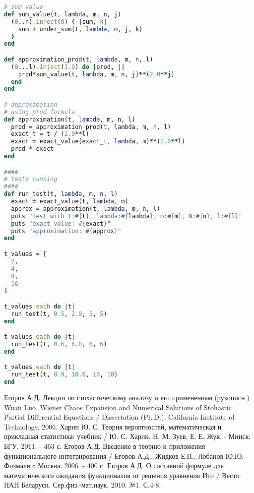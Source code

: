 \documentclass [12pt]{report}
\begin{document}
\begin{lstlisting}[language=Ruby]
# sum value
def sum_value(t, lambda, m, n, j)
  (0..n).inject(0) { |sum, k|
    sum + under_sum(t, lambda, m, j, k)
  }
end

def approximation_prod(t, lambda, m, n, l)
  (0...l).inject(1.0) do |prod, j|
    prod*sum_value(t, lambda, m, n, j)**(2.0**j)
  end
end

# approximation
# using prod formula
def approximation(t, lambda, m, n, l)
  prod = approximation_prod(t, lambda, m, n, l)
  exact_t = t / (2.0**l)
  exact = exact_value(exact_t, lambda, m)**(2.0**l)
  prod * exact
end

####
# tests running
####
def run_test(t, lambda, m, n, l)
  exact = exact_value(t, lambda, m)
  approx = approximation(t, lambda, m, n, l)
  puts "Test with T:#{t}, lambda:#{lambda}, m:#{m}, N:#{n}, l:#{l}"
  puts "exact value: #{exact}"
  puts "approximation: #{approx}"
end

t_values = [
  2,
  4,
  8,
  16
]

t_values.each do |t|
  run_test(t, 0.5, 2.0, 5, 5)
end

t_values.each do |t|
  run_test(t, 0.6, 6.0, 6, 6)
end

t_values.each do |t|
  run_test(t, 0.9, 10.0, 10, 10)
end

\end{lstlisting}


\begin{thebibliography}{99}
 Егоров А.Д. Лекции по стохастическому анализу и его применениям (рукописн.)
 Wuan Luo. Wiener Chaos Expansion and Numerical Solutions of Stohastic Partial Differential Equations / Dissertation (Ph.D.), California Institute of Technology, 2006.
 Харин Ю. С. Теория вероятностей, математическая и прикладная статистика: учебник / Ю. С. Харин, Н. М. Зуев, Е. Е. Жук. - Минск: БГУ, 2011. - 463 с.
 Егоров А.Д. Введение в теорию и приложения функционального интегрирования / Егоров А.Д., Жидков Е.П., Лобанов Ю.Ю. -
Физмалит: Москва, 2006. - 400 с.
 Егоров А.Д. О составной формуле для математического ожидания функционалов от решения уравнения Ито / Вести НАН Беларуси.
Сер.физ.-мат.наук, 2010. №1. С.4-8.
\end{thebibliography}
\end{document}
